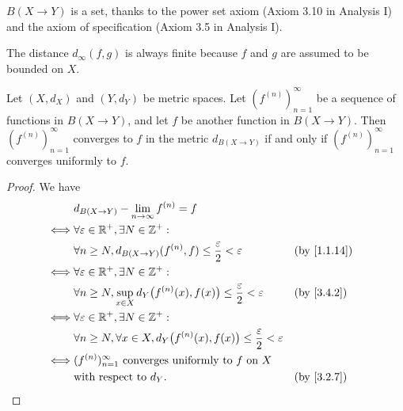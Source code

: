 \begin{note}
  \(B(X \to Y)\) is a set, thanks to the power set axiom (Axiom 3.10 in Analysis I) and the axiom of specification (Axiom 3.5 in Analysis I).
\end{note}

\begin{note}
  The distance \(d_\infty(f, g)\) is always finite because \(f\) and \(g\) are assumed to be bounded on \(X\).
\end{note}

\setcounter{thm}{3}
\begin{prop}\label{3.4.4}
  Let \((X, d_X)\) and \((Y, d_Y)\) be metric spaces.
  Let \((f^{(n)})_{n = 1}^\infty\) be a sequence of functions in \(B(X \to Y)\), and let \(f\) be another function in \(B(X \to Y)\).
  Then \((f^{(n)})_{n = 1}^\infty\) converges to \(f\) in the metric \(d_{B(X \to Y)}\) if and only if \((f^{(n)})_{n = 1}^\infty\) converges uniformly to \(f\).
\end{prop}

\begin{proof}
  We have
  \begin{align*}
         & d_{B(X \to Y)} - \lim_{n \to \infty} f^{(n)} = f                                                                            \\
    \iff & \forall \varepsilon \in \R^+, \exists N \in \Z^+ :                                                                          \\
         & \forall n \geq N, d_{B(X \to Y)}(f^{(n)}, f) \leq \dfrac{\varepsilon}{2} < \varepsilon                     &  & \by{1.1.14} \\
    \iff & \forall \varepsilon \in \R^+, \exists N \in \Z^+ :                                                                          \\
         & \forall n \geq N, \sup_{x \in X} d_Y\big(f^{(n)}(x), f(x)\big) \leq \dfrac{\varepsilon}{2} < \varepsilon   &  & \by{3.4.2}  \\
    \iff & \forall \varepsilon \in \R^+, \exists N \in \Z^+ :                                                                          \\
         & \forall n \geq N, \forall x \in X, d_Y\big(f^{(n)}(x), f(x)\big) \leq \dfrac{\varepsilon}{2} < \varepsilon                  \\
    \iff & (f^{(n)})_{n = 1}^\infty \text{ converges uniformly to } f \text{ on } X                                                    \\
         & \text{with respect to } d_Y.                                                                               &  & \by{3.2.7}
  \end{align*}
\end{proof}

